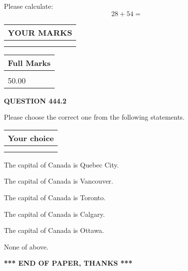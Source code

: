 \documentclass[12pt]{article}
\begin{document}
  
 
Please calculate:
\begin{equation}
28 +  %
54 = \nonumber
\end{equation}
 

 

 
  
\vspace{0.2in}
  
\noindent\begin{tabular}{|l|}
\hline
 YOUR MARKS  \\
\hline
 \\ 
 \\ 
\hline
\end{tabular}
\hspace{0.05in} \begin{tabular}{|l|}
\hline
 Full Marks  \\
\hline
 \\ 
50.00 \\
\hline
\end{tabular}
{\textbf{\Large{QUESTION
444.2 
}}}
  
  
Please choose the correct one from the following statements.
  
  
\noindent\hspace{3.0in} \begin{tabular}{|l|}
\hline
Your choice \\
\hline
 \\ 
 \\ 
\hline
\end{tabular}
  
  
 
 
The capital of Canada is Quebec City.
 
 
The capital of Canada is Vancouver.
 
 
The capital of Canada is Toronto.
 
 
The capital of Canada is Calgary.
 
 
The capital of Canada is Ottawa.
 
 
 None of above.
 
 
   
   
 \vspace{0.2in}
 
   
   
   
   
\vspace{1.0in} 
{\textbf{\large{ *** END OF PAPER, THANKS *** }}} 
   
\end{document}
